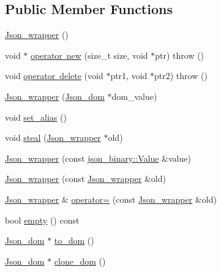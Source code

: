 \subsection*{Public Member Functions}
\begin{DoxyCompactItemize}
\item 
\mbox{\hyperlink{classJson__wrapper_a8b257a35677b04c082c2b44399c03e47}{Json\+\_\+wrapper}} ()
\item 
void $\ast$ \mbox{\hyperlink{classJson__wrapper_a6e434e2fbe3959b7e1beab87b96acf29}{operator new}} (size\+\_\+t size, void $\ast$ptr)  throw ()
\item 
void \mbox{\hyperlink{classJson__wrapper_ae83b361976e62d0168f9268e4c068035}{operator delete}} (void $\ast$ptr1, void $\ast$ptr2)  throw ()
\item 
\mbox{\hyperlink{classJson__wrapper_ae04c087ae4f85772f0458562ef6e062c}{Json\+\_\+wrapper}} (\mbox{\hyperlink{classJson__dom}{Json\+\_\+dom}} $\ast$dom\+\_\+value)
\item 
void \mbox{\hyperlink{classJson__wrapper_a33b604fd1a81e1adaddabb197b7a4baf}{set\+\_\+alias}} ()
\item 
void \mbox{\hyperlink{classJson__wrapper_adcdc1966517861a1bc9ccff22d6ddeb4}{steal}} (\mbox{\hyperlink{classJson__wrapper}{Json\+\_\+wrapper}} $\ast$old)
\item 
\mbox{\hyperlink{classJson__wrapper_a1aaa204561e201d01e0827dbf1f1350e}{Json\+\_\+wrapper}} (const \mbox{\hyperlink{classjson__binary_1_1Value}{json\+\_\+binary\+::\+Value}} \&value)
\item 
\mbox{\hyperlink{classJson__wrapper_a461e9b2ccefcd932f7d93294751c7296}{Json\+\_\+wrapper}} (const \mbox{\hyperlink{classJson__wrapper}{Json\+\_\+wrapper}} \&old)
\item 
\mbox{\hyperlink{classJson__wrapper}{Json\+\_\+wrapper}} \& \mbox{\hyperlink{classJson__wrapper_abbff97b308424dd315c9f11958e64c62}{operator=}} (const \mbox{\hyperlink{classJson__wrapper}{Json\+\_\+wrapper}} \&old)
\item 
bool \mbox{\hyperlink{classJson__wrapper_ad8cd446ff3805d95f97a5f5c5e8ca47f}{empty}} () const
\item 
\mbox{\hyperlink{classJson__dom}{Json\+\_\+dom}} $\ast$ \mbox{\hyperlink{classJson__wrapper_a550e302c01f4b25315b2ee1beb36f3ce}{to\+\_\+dom}} ()
\item 
\mbox{\hyperlink{classJson__dom}{Json\+\_\+dom}} $\ast$ \mbox{\hyperlink{classJson__wrapper_a7c56a53339d7a17885cdfd5177089cf8}{clone\+\_\+dom}} ()
\item 

\end{DoxyCompactItemize}
